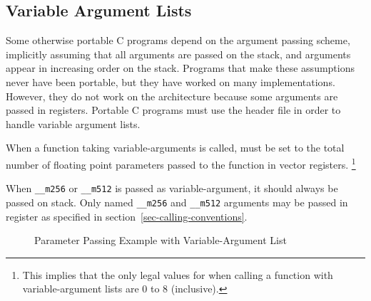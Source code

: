\subsection{Variable Argument Lists}

Some otherwise portable C programs depend on the argument passing
scheme, implicitly assuming that all arguments are passed on the
stack, and arguments appear in increasing order on the stack.
Programs that make these assumptions never have been portable, but
they have worked on many implementations. However, they do not work on
the \xARCH architecture because some arguments are passed in
registers.  Portable C programs must use the header file
 in order to handle variable argument lists.

When a function taking variable-arguments is called, \index{\RAX}
must be set to the total number of floating point parameters passed to
the function in vector registers.%
\footnote{This implies that the only legal values for  when
  calling a function with variable-argument lists are 0 to 8
  (inclusive).}

When \texttt{__m256} or \texttt{__m512} is passed as variable-argument,
it should always be passed on stack. Only named \texttt{__m256} and
\texttt{__m512} arguments may be passed in register as specified in
section~\ref{sec-calling-conventions}.

\begin{figure}[H]
\Hrule
\caption{Parameter Passing Example with Variable-Argument List}
\label{fig_va_passing_example}
\begin{center}
\end{center}
\Hrule
\end{figure}

